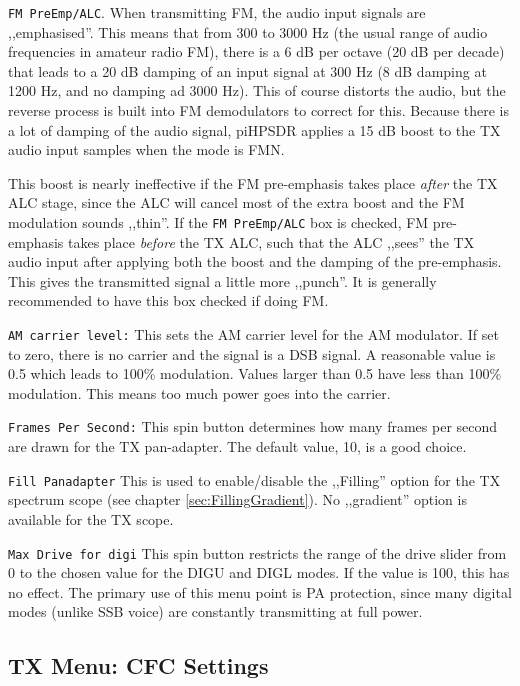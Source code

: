 \documentclass[12pt]{book}
\def\rett#1{\texttt{\color{red}#1}}
\def\pH{pi\-HPSDR\xspace}
\begin{document}
\rett{FM PreEmp/ALC}. When transmitting FM, the audio input signals are ,,emphasised''.
This means that from 300 to 3000 Hz (the usual range of audio frequencies in amateur
radio FM), there is a 6 dB per octave (20 dB per decade) that leads to a 20 dB damping
of an input signal at 300 Hz (8 dB damping at 1200 Hz, and no damping ad 3000 Hz).
This of course distorts the audio, but the reverse process is built into FM demodulators
to correct for this. Because there is a lot of damping of the audio signal, \pH
applies a 15 dB boost to the TX audio input samples when the mode is FMN.

This boost is nearly ineffective if the FM pre-emphasis takes place \textit{after}
the TX ALC stage, since the ALC will cancel most of the extra boost and the FM
modulation sounds ,,thin''. If the \rett{FM PreEmp/ALC} box is checked, FM
pre-emphasis takes place \textit{before} the TX ALC, such that the ALC ,,sees''
the TX audio input after applying both the boost and the damping of the pre-emphasis. This gives the
transmitted signal a little more ,,punch''. It is generally recommended to have this box checked
if doing FM.

\rett{AM carrier level:} This sets the AM carrier level for the AM modulator. If set to zero, there is no
carrier and the
signal is a DSB signal. A reasonable value is 0.5 which leads to 100\% modulation. Values larger than
0.5 have less than 100\% modulation. This means too much power goes into the carrier.

\rett{Frames Per Second:} This spin button determines how many frames per second are drawn for the TX
pan-adapter. The default value, 10, is a good choice.

\rett{Fill Panadapter} This is used to enable/disable the ,,Filling'' option
for the TX  spectrum scope (see chapter \ref{sec:FillingGradient}). No ,,gradient''
option is available for the TX scope.


\rett{Max Drive for digi} This spin button restricts the range of the drive slider from 0 to the
chosen value
for the DIGU and DIGL modes. If the value is 100, this has no effect. The primary use of this menu point is
PA protection,
since many digital modes (unlike SSB voice) are constantly transmitting at full power.

\subsection{TX Menu: CFC Settings}
\end{document}
